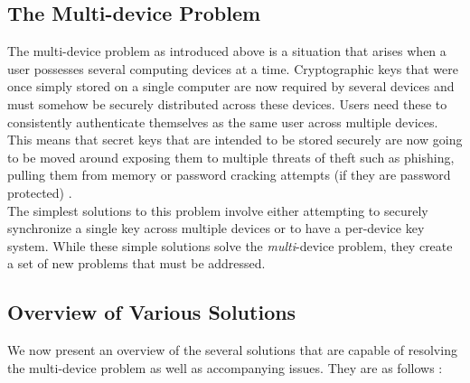 \subsection{The Multi-device Problem}
The multi-device problem as introduced above is a situation that arises when a user possesses several computing devices at a time. Cryptographic keys that were once simply stored on a single computer are now required by several devices and must somehow be securely distributed across these devices. Users need these to consistently authenticate themselves as the same user across multiple devices. This means that secret keys that are intended to be stored securely are now going to be moved around exposing them to multiple threats of theft such as phishing, pulling them from memory or password cracking attempts (if they are password protected) \cite{Atwater2016}.\\
The simplest solutions to this problem involve either attempting to securely synchronize a single key across multiple devices or to have a per-device key system. While these simple solutions solve the \emph{multi}-device problem, they create a set of new problems that must be addressed\cite{Atwater2016}.

\subsection{Overview of Various Solutions}
We now present an overview of the several solutions that are capable of resolving the multi-device problem as well as accompanying issues. They are as follows \cite{Atwater2016}:

